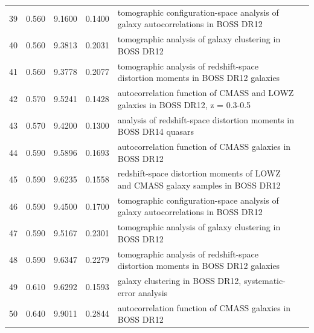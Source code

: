 \begin{table}
\begin{tabular}{llllp{70mm}l}
    39 & 0.560 &  9.1600 & 0.1400 &
    tomographic configuration-space analysis of galaxy autocorrelations in BOSS DR12 &
    \cite{2017MNRAS.469.3762W} \\
    40 & 0.560 &  9.3813 & 0.2031 &
    tomographic analysis of galaxy clustering in BOSS DR12 &
    \cite{2018MNRAS.481.3160W} \\
    41 & 0.560 &  9.3778 & 0.2077 &
    tomographic analysis of redshift-space distortion moments in BOSS DR12 galaxies &
    \cite{2017MNRAS.466..762Z} \\
    42 & 0.570 &  9.5241 & 0.1428 &
    autocorrelation function of CMASS and LOWZ galaxies in BOSS DR12, z = 0.3-0.5 &
    \cite{2016MNRAS.457.1770C} \\
    43 & 0.570 &  9.4200 & 0.1300 &
    analysis of redshift-space distortion moments in BOSS DR14 quasars &
    \cite{2018MNRAS.477.1604G} \\
    44 & 0.590 &  9.5896 & 0.1693 &
    autocorrelation function of CMASS galaxies in BOSS DR12 &
    \cite{2016MNRAS.461.3781C} \\
    45 & 0.590 &  9.6235 & 0.1558 &
    redshift-space distortion moments of LOWZ and CMASS galaxy samples in BOSS DR12 &
    \cite{2017MNRAS.471.2370C} \\
    46 & 0.590 &  9.4500 & 0.1700 &
    tomographic configuration-space analysis of galaxy autocorrelations in BOSS DR12 &
    \cite{2017MNRAS.469.3762W} \\
    47 & 0.590 &  9.5167 & 0.2301 &
    tomographic analysis of galaxy clustering in BOSS DR12 &
    \cite{2018MNRAS.481.3160W} \\
    48 & 0.590 &  9.6347 & 0.2279 &
    tomographic analysis of redshift-space distortion moments in BOSS DR12 galaxies &
    \cite{2017MNRAS.466..762Z} \\
    49 & 0.610 &  9.6292 & 0.1593 &
    galaxy clustering in BOSS DR12, systematic-error analysis &
    \cite{2018MNRAS.477.1153V} \\
    50 & 0.640 &  9.9011 & 0.2844 &
    autocorrelation function of CMASS galaxies in BOSS DR12 &
    \cite{2016MNRAS.461.3781C} \\
  \end{tabular}
\end{table}
